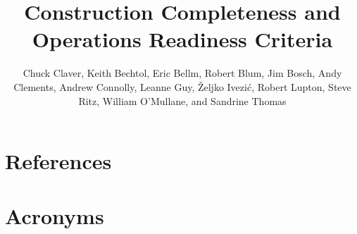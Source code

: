 \documentclass[SE,lsstdraft,authoryear,toc]{lsstdoc}
\title{Construction Completeness and Operations Readiness Criteria}
\author{%
Chuck Claver, 
Keith Bechtol, 
Eric Bellm,
Robert Blum, 
Jim Bosch, 
Andy Clements,
Andrew Connolly, 
Leanne Guy,  
\v{Z}eljko Ivezi\'{c}, 
Robert Lupton,
Steve Ritz,
William O'Mullane, and
Sandrine Thomas
}
\date{\vcsDate}
\begin{document}
\maketitle














\pagebreak

\appendix
\section{References} \label{sec:bib}
\renewcommand{\refname}{} %


\pagebreak

\section{Acronyms} \label{sec:acronyms}

\end{document}
